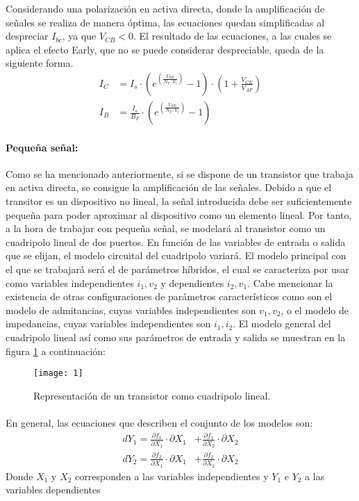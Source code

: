 Considerando una polarización en activa directa, donde la amplificación de señales se realiza de manera óptima, las ecuaciones quedan simplificadas al despreciar $I_{bc}$, ya que $V_{CB} < 0$. El resultado de las ecuaciones, a las cuales se aplica el efecto Early, que no se puede considerar despreciable, queda de la siguiente forma. 
\begin{align} 
   \label{eq:1}
   I_C &= I_s \cdot \left(e^{\left(\frac {V_{BE}}{N_{T} \cdot V_t} \right)} - 1\right) \cdot \left(1 + \frac{V_{CE}} {V_{AF}} \right)\\ 
   \label{eq:2}
   I_B &= \frac{I_s}{B_F} \cdot \left(e^{\left(\frac {V_{BE}}{N_{T} \cdot V_t} \right)} - 1\right)
\end{align}

\paragraph{Pequeña señal:}
Como se ha mencionado anteriormente, si se dispone de un transistor que trabaja en activa directa, se consigue la amplificación de las señales. 
Debido a que el transitor es un dispositivo no lineal, la señal introducida debe ser suficientemente pequeña para poder aproximar al dispositivo como un elemento lineal.
Por tanto, a la hora de trabajar con pequeña señal, se modelará al transistor como un cuadripolo lineal de dos puertos. 
En función de las variables de entrada o salida que se elijan, el modelo circuital del cuadripolo variará. El modelo principal con el que se trabajará será el de parámetros híbridos, el cual se caracteriza por usar como variables independientes $i_1, v_2$ y dependientes $i_2, v_1$. Cabe mencionar la existencia de otras configuraciones de parámetros característicos como son el modelo de admitancias, cuyas variables independientes son $v_1, v_2$, o el modelo de impedancias, cuyas variables independientes son $i_1, i_2$.
El modelo general del cuadripolo lineal así como sus parámetros de entrada y salida se muestran en la figura \ref{fig:1} a continuaci\'on:
\begin{figure}[h]
    \centering
    \texttt{[image: 1]}
    \caption{Representación de un transistor como cuadripolo lineal.}
    \label{fig:1}
\end{figure}
\paragraph{}
En general, las ecuaciones que describen el conjunto de los modelos son:
\begin{align} 
   dY_1 = \frac {\partial f_1}{\partial X_1} \cdot \partial X_1 &+ \frac {\partial f_1}{\partial X_2} \cdot \partial X_2 \\ 
   dY_2 = \frac {\partial f_2}{\partial X_1} \cdot \partial X_1 &+ \frac {\partial f_2}{\partial X_2} \cdot \partial X_2 
\end{align}
Donde $X_1$ y $X_2$ corresponden a las variables independientes y $Y_1$ e $Y_2$ a las variables dependientes
